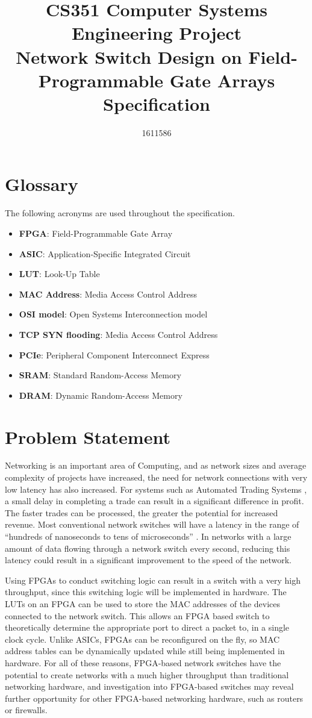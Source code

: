 \documentclass[12pt, a4paper, twoside, onecolumn]{article}
\title{CS351 Computer Systems Engineering Project \\ \vspace{0.5cm} Network Switch Design on Field-Programmable Gate Arrays \\ \vspace{0.3cm} \Large{Specification}}
\author{1611586}
\begin{document}


\tableofcontents
\newpage

\section{Glossary}
\label{glossary}
The following acronyms are used throughout the specification.
\begin{itemize}
  \item \textbf{FPGA}: Field-Programmable Gate Array
  \item \textbf{ASIC}: Application-Specific Integrated Circuit
  \item \textbf{LUT}: Look-Up Table
  \item \textbf{MAC Address}: Media Access Control Address
  \item \textbf{OSI model}: Open Systems Interconnection model
  \item \textbf{TCP SYN flooding}: Media Access Control Address
  \item \textbf{PCIe}: Peripheral Component Interconnect Express
  \item \textbf{SRAM}: Standard Random-Access Memory
  \item \textbf{DRAM}: Dynamic Random-Access Memory
  \
\end{itemize}

\section{Problem Statement}
\label{problem_statement}
Networking is an important area of Computing, and as network sizes and average complexity of projects have increased, the need for network connections with very low latency has also increased. For systems such as Automated Trading Systems \cite{automated_trading_system}, a small delay in completing a trade can result in a significant difference in profit. The faster trades can be processed, the greater the potential for increased revenue. Most conventional network switches will have a latency in the range of ``hundreds of nanoseconds to tens of microseconds'' \cite{latency_ethernet_switches}. In networks with a large amount of data flowing through a network switch every second, reducing this latency could result in a significant improvement to the speed of the network.

Using FPGAs to conduct switching logic can result in a switch with a very high throughput, since this switching logic will be implemented in hardware. The LUTs on an FPGA can be used to store the MAC addresses of the devices connected to the network switch. This allows an FPGA based switch to theoretically determine the appropriate port to direct a packet to, in a single clock cycle. Unlike ASICs, FPGAs can be reconfigured on the fly, so MAC address tables can be dynamically updated while still being implemented in hardware.
For all of these reasons, FPGA-based network switches have the potential to create networks with a much higher throughput than traditional networking hardware, and investigation into FPGA-based switches may reveal further opportunity for other FPGA-based networking hardware, such as routers or firewalls.
\end{document}
